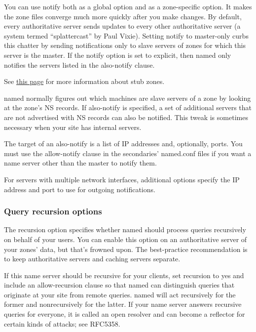 You can use {notify} both as a global option and as a zone-specific
option. It makes the zone files converge much more quickly after you
make changes. By default, every authoritative server sends updates to
every other authoritative server (a system termed
``\protect\hypertarget{part0024_split_037.htmlux5cux23_idIndexMarker2129}{}{}\protect\hypertarget{part0024_split_037.htmlux5cux23_idIndexMarker2130}{}{}splattercast''
by
\protect\hypertarget{part0024_split_037.htmlux5cux23_idIndexMarker2131}{}{}Paul
Vixie). Setting {notify} to {master-only} curbs this chatter by sending
notifications only to slave servers of zones for which this server is
the master. If the {notify} option is set to {explicit,} then {named}
only notifies the servers listed in the {also-notify} clause.

\leavevmode\hypertarget{part0024_split_037.htmlux5cux23_idContainer976}{}%
See
\protect\hyperlink{part0024_split_044.htmlux5cux23_idTextAnchor914}{this
page} for more information about stub zones.

{named} normally figures out which machines are slave servers of a zone
by looking at the zone's NS records. If {also-notify} is specified, a
set of additional servers that are not advertised with NS records can
also be notified. This tweak is sometimes necessary when your site has
internal servers.

The target of an {also-notify} is a list of IP addresses and,
optionally, ports. You must use the {allow-notify} clause in the
secondaries' {named.conf} files if you want a name server other than the
master to notify them.

For servers with multiple network interfaces, additional options specify
the IP address and port to use for outgoing notifications.

\subsubsection{Query recursion options}


The
\protect\hypertarget{part0024_split_037.htmlux5cux23_idIndexMarker2132}{}{}{recursion}
option specifies whether {named} should process queries recursively on
behalf of your users. You can enable this option on an authoritative
server of your zones' data, but that's frowned upon. The best-practice
recommendation is to keep authoritative servers and caching servers
separate.

\protect\hypertarget{part0024_split_037.htmlux5cux23_idIndexMarker2133}{}{}If
this name server should be recursive for your clients, set {recursion}
to {yes} and include an {allow-recursion} clause so that {named} can
distinguish queries that originate at your site from remote queries.
{named} will act recursively for the former and nonrecursively for the
latter. If your name server answers recursive queries for everyone, it
is called an open resolver and can become a reflector for certain kinds
of attacks; see RFC5358.

